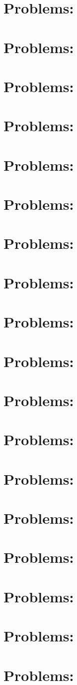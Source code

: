 \documentclass[10pt]{article}
\newcommand{\1}{{\mathrm 1\hspace*{-0.4ex}%
\rule{0.1ex}{1.52ex}\hspace*{0.2ex}}}
\newcommand{\problemtitle}[1]{\section{Problems: #1}}
\newcommand{\probleminput}[1]{}
\begin{document}
\problemtitle{\matricesTitle}
\probleminput{\matricesPath/problems}

\problemtitle{\propMatricesTitle}
\probleminput{\propMatricesPath/problems}

\problemtitle{\inverseMatTitle}
\probleminput{\inverseMatPath/problems}

\problemtitle{\luDecompTitle}
\probleminput{\luDecompPath/problems}

\problemtitle{\elemMatDetTitle}
\probleminput{\elemMatDetPath/problems}

\problemtitle{\elemMatDetIITitle}
\probleminput{\elemMatDetIIPath/problems}

\problemtitle{\propDetTitle}
\probleminput{\propDetPath/problems}

\problemtitle{\subspacesTitle}
\probleminput{\subspacesPath/problems}

\problemtitle{\linIndepTitle}
\probleminput{\linIndepPath/problems}

\problemtitle{\basisDimTitle}
\probleminput{\basisDimPath/problems}

\problemtitle{\eigenTitle}
\probleminput{\eigenPath/problems}

\problemtitle{\eigenIITitle}
\probleminput{\eigenIIPath/problems}

\problemtitle{\diagTitle}
\probleminput{\diagPath/problems}

\problemtitle{\orthonormTitle}
\probleminput{\orthonormPath/problems}

\problemtitle{\gramSchmidtTitle}
\probleminput{\gramSchmidtPath/problems}

\problemtitle{\diagSymMatTitle}
\probleminput{\diagSymMatPath/problems}

\problemtitle{}
\probleminput{\kernelPath/problems}

\problemtitle{\leastSquaresTitle}
\probleminput{\leastSquaresPath/problems}
\end{document}
